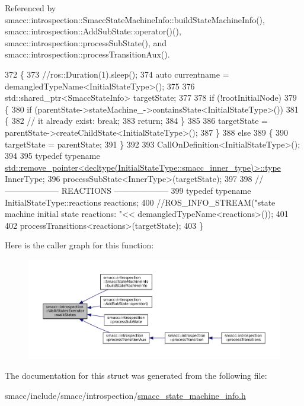 Referenced by smacc\+::introspection\+::\+Smacc\+State\+Machine\+Info\+::build\+State\+Machine\+Info(), smacc\+::introspection\+::\+Add\+Sub\+State\+::operator()(), smacc\+::introspection\+::process\+Sub\+State(), and smacc\+::introspection\+::process\+Transition\+Aux().


\begin{DoxyCode}
372 \{
373     \textcolor{comment}{//ros::Duration(1).sleep();}
374     \textcolor{keyword}{auto} currentname = demangledTypeName<InitialStateType>();
375 
376     std::shared\_ptr<SmaccStateInfo> targetState;
377 
378     \textcolor{keywordflow}{if} (!rootInitialNode)
379     \{
380         \textcolor{keywordflow}{if} (parentState->stateMachine\_->containsState<InitialStateType>())
381         \{
382             \textcolor{comment}{// it already exist: break;}
383             \textcolor{keywordflow}{return};
384         \}
385 
386         targetState = parentState->createChildState<InitialStateType>();
387     \}
388     \textcolor{keywordflow}{else}
389     \{
390         targetState = parentState;
391     \}
392 
393     CallOnDefinition<InitialStateType>();
394 
395     \textcolor{keyword}{typedef} \textcolor{keyword}{typename} 
      \hyperlink{namespacegenerate__debs_a50bc9a7ecac9584553e089a448bcde58}{std::remove\_pointer<decltype(InitialStateType::smacc\_inner\_type)>::type}
       InnerType;
396     processSubState<InnerType>(targetState);
397 
398     \textcolor{comment}{// -------------------- REACTIONS --------------------}
399     \textcolor{keyword}{typedef} \textcolor{keyword}{typename} InitialStateType::reactions reactions;
400     \textcolor{comment}{//ROS\_INFO\_STREAM("state machine initial state reactions: "<< demangledTypeName<reactions>());}
401 
402     processTransitions<reactions>(targetState);
403 \}
\end{DoxyCode}
Here is the caller graph for this function\+:
\nopagebreak
\begin{figure}[H]
\begin{center}
\leavevmode
\includegraphics[width=350pt]{structsmacc_1_1introspection_1_1WalkStatesExecutor_a21848ccc6e7a7ddee0ccfff97e550ec6_icgraph}
\end{center}
\end{figure}


The documentation for this struct was generated from the following file\+:\begin{DoxyCompactItemize}
\item 
smacc/include/smacc/introspection/\hyperlink{smacc__state__machine__info_8h}{smacc\+\_\+state\+\_\+machine\+\_\+info.\+h}\end{DoxyCompactItemize}
